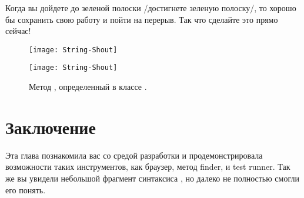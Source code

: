 \documentclass[a4paper,10pt,twoside]{book}
\begin{document}
Когда вы дойдете до зеленой полоски /достигнете зеленую полоску/,
то хорошо бы сохранить свою работу и пойти на перерыв.
Так что сделайте это прямо сейчас! 

\begin{figure}[hbt]
\ifluluelse
	{\centerline{\texttt{[image: String-Shout]}}}
	{\centerline{\texttt{[image: String-Shout]}}}
\caption{Метод , определенный в классе .
}
\end{figure}

\section{Заключение}


Эта глава познакомила вас со средой разработки \pharo и
продемонстрировала возможности таких инструментов, как браузер,
метод finder, и test runner. Так же вы увидели небольшой фрагмент
синтаксиса \pharo, но далеко не полностью смогли его понять. 
\end{document}
